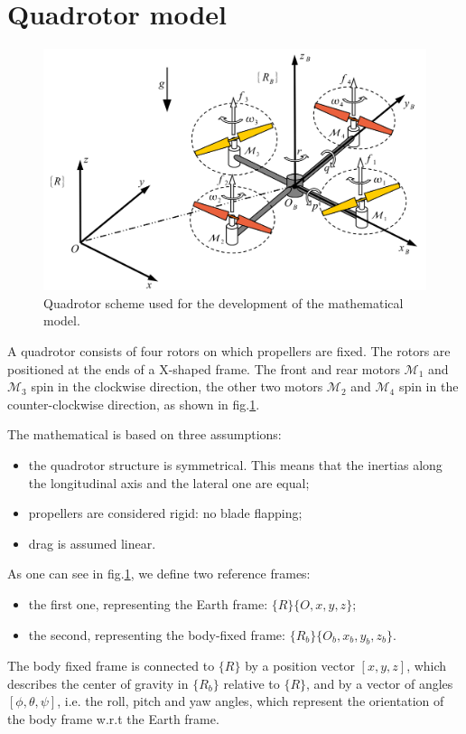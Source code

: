 \documentclass[11pt,a4paper]{scrartcl}
\begin{document}
\section{Quadrotor model}

\begin{figure}
	\centering
	\includegraphics[width=0.7\linewidth]{Images/Quad_model}
	\caption{Quadrotor scheme used for the development of the mathematical model.}
	\label{fig:quadmodel}
\end{figure}

A quadrotor consists of four rotors on which propellers are fixed. The rotors are positioned at the ends of a X-shaped frame. The front and rear motors $\mathcal{M}_1$ and $\mathcal{M}_3$ spin in the clockwise direction, the other two motors $\mathcal{M}_2$ and $\mathcal{M}_4$ spin in the counter-clockwise direction, as shown in fig.\ref{fig:quadmodel}.

The mathematical is based on three assumptions:
\begin{itemize}
	\item the quadrotor structure is symmetrical. This means that the inertias along the longitudinal axis and the lateral one are equal;
	\item propellers are considered rigid: no blade flapping;
	\item drag is assumed linear.
\end{itemize}

As one can see in fig.\ref{fig:quadmodel}, we define two reference frames:
\begin{itemize}
	\item the first one, representing the Earth frame: $ \{R\}\{O, x, y, z\} $;
	\item the second, representing the body-fixed frame: $ \{R_b\}\{O_b, x_b, y_b, z_b\} $.
\end{itemize}

The body fixed frame is connected to $ \{R\} $ by a position vector $ [x, y, z] $, which describes the center of gravity in $ \{R_b\} $ relative to $ \{R\} $, and by a vector of angles $ [\phi, \theta, \psi] $, i.e. the roll, pitch and yaw angles, which represent the orientation of the body frame w.r.t the Earth frame.
\end{document}
